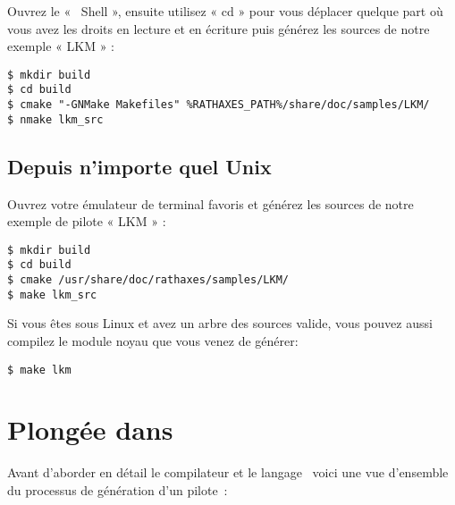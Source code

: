 \documentclass[francais]{rtxarticle}
\begin{document}
Ouvrez le « \rtx\ Shell », ensuite utilisez « cd » pour vous déplacer quelque
part où vous avez les droits en lecture et en écriture puis générez les sources
de notre exemple « LKM » :

\begin{lstlisting}
$ mkdir build
$ cd build
$ cmake "-GNMake Makefiles" %RATHAXES_PATH%/share/doc/samples/LKM/
$ nmake lkm_src
\end{lstlisting}

\subsection{Depuis n'importe quel Unix}

Ouvrez votre émulateur de terminal favoris et générez les sources de notre
exemple de pilote « LKM » :

\begin{lstlisting}
$ mkdir build
$ cd build
$ cmake /usr/share/doc/rathaxes/samples/LKM/
$ make lkm_src
\end{lstlisting}

Si vous êtes sous Linux et avez un arbre des sources valide, vous pouvez aussi
compilez le module noyau que vous venez de générer:

\begin{lstlisting}
$ make lkm
\end{lstlisting}

\section{Plongée dans \rtx}

Avant d'aborder en détail le compilateur et le langage \rtx\ voici une vue
d'ensemble du processus de génération d'un pilote~:
\end{document}
